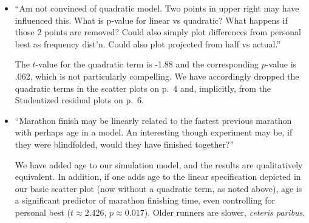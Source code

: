 \documentclass[12pt]{article}
\begin{document}
\begin{itemize}
\item ``Am not convinced of quadratic model. Two points in upper right
  may have influenced this. What is p-value for linear vs quadratic?
  What happens if those 2 points are removed? Could also simply plot
  differences from personal best as frequency dist'n. Could also plot
  projected from half vs actual.''

  The $t$-value for the quadratic term is -1.88 and the corresponding $p$-value is .062, which is not
  particularly compelling.  We have accordingly dropped the quadratic
  terms in the scatter plots on p.\ 4 and, implicitly, from the
  Studentized residual plots on p.\ 6.
  
  
  
  
  
  
\item ``Marathon finish may be linearly related to the fastest
  previous marathon with perhaps age in a model. An interesting though
  experiment may be, if they were blindfolded, would they have
  finished together?''

  We have added age to our simulation model, and the results are
  qualitatively equivalent.  In addition, if one adds age to the
  linear specification depicted in our basic scatter plot (now without
  a quadratic term, as noted above), age is a significant predictor of
  marathon finishing time, even controlling for personal best
  ($t \approx 2.426$, $p \approx 0.017$).  Older runners are slower, \emph{ceteris
    paribus}.


\end{itemize}
\end{document}
